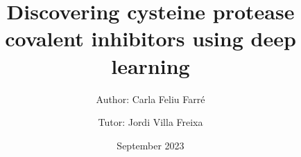 \documentclass[final,times,twocolumn,article]{elsarticle}
\begin{document}
\begin{frontmatter}



\title{Discovering cysteine protease covalent inhibitors using deep learning}


\author{Author: Carla Feliu Farré}
\author{Tutor: Jordi Villa Freixa}
\date{September 2023}


\end{frontmatter}
\end{document}
